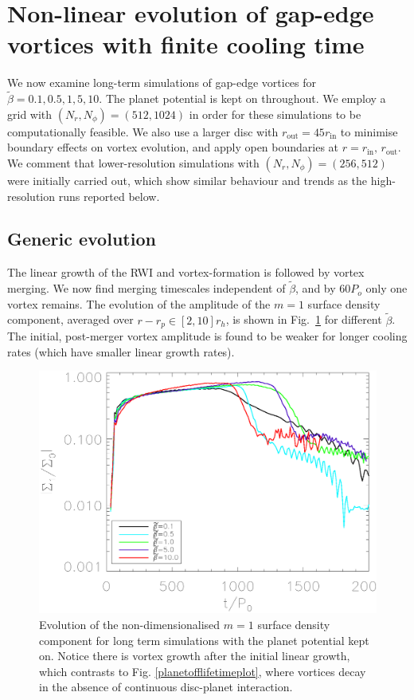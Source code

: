 
\section{Non-linear evolution of
  gap-edge vortices with finite cooling time}\label{nonlinear} 
We now examine long-term simulations of gap-edge vortices for
$\tilde{\beta}=0.1,0.5,1,5,10$. The planet potential is kept on
throughout. We employ a grid with $(N_r,N_{\phi})=(512,1024)$ in order
for these 
simulations to be computationally feasible. We also use a larger
disc with $r_{\mathrm{out}}=45r_{\mathrm{in}}$ to minimise boundary
effects on vortex evolution, and apply open boundaries at
$r=r_\mathrm{in},\,r_\mathrm{out}$. We comment that lower-resolution
simulations with $(N_r,N_{\phi})=(256,512)$ were initially carried
out, which show similar behaviour and trends as the high-resolution
runs reported below.   

\subsection{Generic evolution} 
The linear growth of the RWI and vortex-formation is followed by 
vortex merging. We now find merging timescales independent of
$\tilde\beta$, and by $60P_o$ only one vortex remains. 
The evolution of the amplitude of the $m=1$ surface density component,
averaged over $r-r_p\in[2,10]r_h$, is shown in Fig.~\ref{lifetimeplot} 
for different $\tilde\beta$. The initial, post-merger vortex amplitude
is found to be weaker for longer cooling rates (which have smaller 
linear growth rates). 

\begin{figure}
  \includegraphics[width=\linewidth,clip=true,trim=0.5cm
  0cm 0cm 1cm]{figures/longterm_stability}
  \caption{Evolution of the non-dimensionalised $m=1$ surface density component
    for long term
    simulations with the planet potential kept on. Notice there is
    vortex growth after the initial linear growth, which
    contrasts to Fig. \ref{planetofflifetimeplot}, where vortices
    decay in the absence of continuous disc-planet interaction. 
    \label{lifetimeplot}}   
\end{figure}

